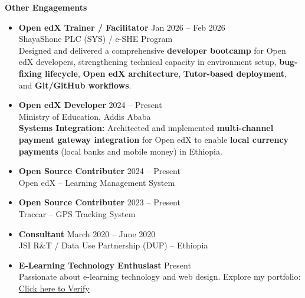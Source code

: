 \documentclass[11pt,a4paper]{article}
\begin{document}
\vspace{0.8em}

\noindent \textbf{\Large Other Engagements} \vspace{0.3em}

\begin{itemize}[leftmargin=*,noitemsep,topsep=0pt]
    \item \textbf{Open edX Trainer / Facilitator} \hfill Jan 2026 -- Feb 2026 \\
    ShayaShone PLC (SYS) / e-SHE Program \\
    Designed and delivered a comprehensive \textbf{developer bootcamp} for Open edX developers, strengthening technical capacity in environment setup, \textbf{bug-fixing lifecycle}, \textbf{Open edX architecture}, \textbf{Tutor-based deployment}, and \textbf{Git/GitHub workflows}.
    \item \textbf{Open edX Developer} \hfill 2024 -- Present \\
    Ministry of Education, Addis Ababa \\
    \textbf{Systems Integration:} Architected and implemented \textbf{multi-channel payment gateway integration} for Open edX to enable \textbf{local currency payments} (local banks and mobile money) in Ethiopia.
    \item \textbf{Open Source Contributer} \hfill 2024 -- Present \\
    Open edX -- Learning Management System
    \item \textbf{Open Source Contributer} \hfill 2023 -- Present \\
    Traccar -- GPS Tracking System
    \item \textbf{Consultant} \hfill March 2020 -- June 2020 \\
    JSI R\&T / Data Use Partnership (DUP) -- Ethiopia
    \item \textbf{E-Learning Technology Enthusiast} \hfill Present \\
    Passionate about e-learning technology and web design. Explore my portfolio: \href{https://haftamuk.github.io/WebDesignPortfolio/}{ Click here to Verify}
\end{itemize}

\end{document}
